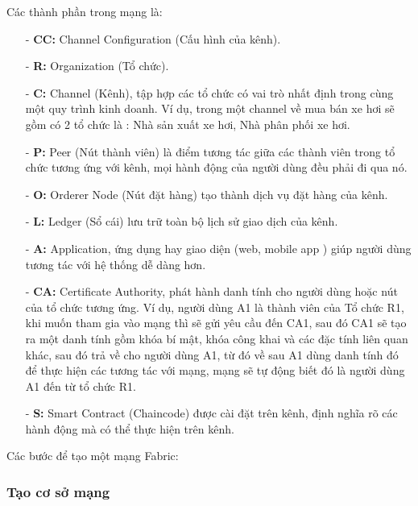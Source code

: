 Các thành phần trong mạng là:
\begin{itemize}
    \item[-] \textbf{CC:} Channel Configuration (Cấu hình của kênh).
    \item[-] \textbf{R:} Organization (Tổ chức).
    \item[-] \textbf{C:} Channel (Kênh), tập hợp các tổ chức có vai trò nhất định 
    trong cùng một quy trình kinh doanh. Ví dụ, trong một channel về mua bán 
    xe hơi sẽ gồm có 2 tổ chức là : Nhà sản xuất xe hơi, Nhà phân phối xe hơi.  
    \item[-] \textbf{P:} Peer (Nút thành viên) là điểm tương tác giữa các thành viên 
    trong tổ chức tương ứng với kênh, mọi hành động của người dùng đều 
    phải đi qua nó.
    \item[-] \textbf{O:} Orderer Node (Nút đặt hàng) tạo thành dịch vụ đặt hàng của kênh.
    \item[-] \textbf{L:} Ledger (Sổ cái) lưu trữ toàn bộ lịch sử giao dịch của kênh.
    \item[-] \textbf{A:} Application, ứng dụng hay giao diện (web, mobile app ) giúp người dùng tương tác với hệ thống dễ dàng hơn.
    \item[-] \textbf{CA:} Certificate Authority, phát hành danh tính cho người dùng 
    hoặc nút của tổ chức tương ứng. Ví dụ, người dùng A1 là thành viên của 
    Tổ chức R1, khi muốn tham gia vào mạng thì sẽ gửi yêu cầu đến CA1, 
    sau đó CA1 sẽ tạo ra một danh tính gồm khóa bí mật, khóa công khai và các 
    đặc tính liên quan khác, sau đó trả về cho người dùng A1, từ đó về sau 
    A1 dùng danh tính đó để thực hiện các tương tác với mạng, mạng sẽ tự động 
    biết đó là người dùng A1 đến từ tổ chức R1.
    \item[-] \textbf{S:} Smart Contract (Chaincode) được cài đặt trên kênh, định nghĩa rõ các hành động mà có thể thực hiện trên kênh.
    
\end{itemize}

Các bước để tạo một mạng Fabric:

\subsubsection{Tạo cơ sở mạng}

